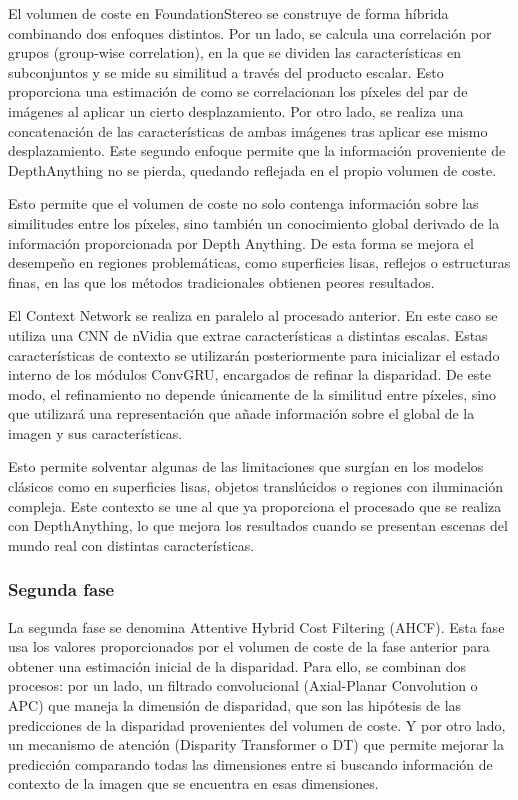 El volumen de coste en FoundationStereo se construye de forma híbrida combinando dos enfoques distintos. Por un lado, se calcula una correlación por grupos (group-wise correlation), en la que se dividen las características en subconjuntos y se mide su similitud a través del producto escalar. Esto proporciona una estimación de como se correlacionan los píxeles del par de imágenes al aplicar un cierto desplazamiento. Por otro lado, se realiza una concatenación de las características de ambas imágenes tras aplicar ese mismo desplazamiento. Este segundo enfoque permite que la información proveniente de DepthAnything no se pierda, quedando reflejada en el propio volumen de coste.

Esto permite que el volumen de coste no solo contenga información sobre las similitudes entre los píxeles, sino también un conocimiento global derivado de la información proporcionada por Depth Anything. De esta forma se mejora el desempeño en regiones problemáticas, como superficies lisas, reflejos o estructuras finas, en las que los métodos tradicionales obtienen peores resultados.

El Context Network se realiza en paralelo al procesado anterior. En este caso se utiliza una CNN de nVidia que extrae características a distintas escalas. Estas características de contexto se utilizarán posteriormente para inicializar el estado interno de los módulos ConvGRU, encargados de refinar la disparidad. De este modo, el refinamiento no depende únicamente de la similitud entre píxeles, sino que utilizará una representación que añade información sobre el global de la imagen y sus características.

Esto permite solventar algunas de las limitaciones que surgían en los modelos clásicos como en superficies lisas, objetos translúcidos o regiones con iluminación compleja. Este contexto se une al que ya proporciona el procesado que se realiza con DepthAnything, lo que mejora los resultados cuando se presentan escenas del mundo real con distintas características.

\subsubsection{Segunda fase}
La segunda fase se denomina Attentive Hybrid Cost Filtering (AHCF). Esta fase usa los valores proporcionados por el volumen de coste de la fase anterior para obtener una estimación inicial de la disparidad. Para ello, se combinan dos procesos: por un lado, un filtrado convolucional (Axial-Planar Convolution o APC) que maneja la dimensión de disparidad, que son las hipótesis de las predicciones de la disparidad provenientes del volumen de coste. Y por otro lado, un mecanismo de atención (Disparity Transformer o DT) que permite mejorar la predicción comparando todas las dimensiones entre si buscando información de contexto de la imagen que se encuentra en esas dimensiones.

